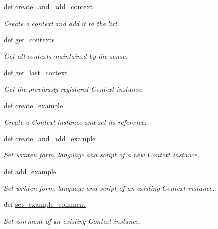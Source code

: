 \begin{DoxyCompactItemize}
def \hyperlink{classlmf_1_1src_1_1core_1_1sense_1_1_sense_a14ced3b1dd8115d72283d6708d3ce0b5}{create\+\_\+and\+\_\+add\+\_\+context}
\begin{DoxyCompactList}\small\item\em Create a context and add it to the list. \end{DoxyCompactList}\item 
def \hyperlink{classlmf_1_1src_1_1core_1_1sense_1_1_sense_a50f6e0ba88d00c3315b91d3787aa9085}{get\+\_\+contexts}
\begin{DoxyCompactList}\small\item\em Get all contexts maintained by the sense. \end{DoxyCompactList}\item 
def \hyperlink{classlmf_1_1src_1_1core_1_1sense_1_1_sense_af9c1b79eed28bd28279719bdf578d218}{get\+\_\+last\+\_\+context}
\begin{DoxyCompactList}\small\item\em Get the previously registered Context instance. \end{DoxyCompactList}\item 
def \hyperlink{classlmf_1_1src_1_1core_1_1sense_1_1_sense_a61c046aabce91368de9129dd83c2bb20}{create\+\_\+example}
\begin{DoxyCompactList}\small\item\em Create a Context instance and set its reference. \end{DoxyCompactList}\item 
def \hyperlink{classlmf_1_1src_1_1core_1_1sense_1_1_sense_ac901c4bce7721237a2e2c58bf7a11f2b}{create\+\_\+and\+\_\+add\+\_\+example}
\begin{DoxyCompactList}\small\item\em Set written form, language and script of a new Context instance. \end{DoxyCompactList}\item 
def \hyperlink{classlmf_1_1src_1_1core_1_1sense_1_1_sense_ab84c8d7a1cdcce014f99e0c1a1b0aedd}{add\+\_\+example}
\begin{DoxyCompactList}\small\item\em Set written form, language and script of an existing Context instance. \end{DoxyCompactList}\item 
def \hyperlink{classlmf_1_1src_1_1core_1_1sense_1_1_sense_a9b8d8ea7fe946dd19e2538fe7801754a}{set\+\_\+example\+\_\+comment}
\begin{DoxyCompactList}\small\item\em Set comment of an existing Context instance. \end{DoxyCompactList}\item 

\end{DoxyCompactItemize}
